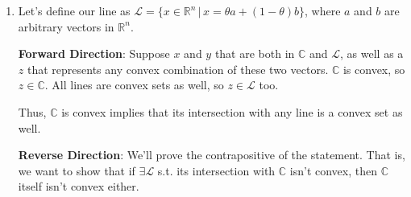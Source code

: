 \documentclass[12pt]{article}
\begin{document}
\begin{enumerate}
      \item Let's define our line as $\mathcal{L} = \{x \in \mathbb{R}^n\,|\, x=\theta a + (1-\theta) b\}$,
            where $a$ and $b$ are arbitrary vectors in $\mathbb{R}^n$.

            \textbf{Forward Direction}:
            Suppose $x$ and $y$ that are both in $\mathbb{C}$ and $\mathcal{L}$,
            as well as a $z$ that represents any convex combination of these two vectors.
            $\mathbb{C}$ is convex, so $z \in \mathbb{C}$.
            All lines are convex sets as well, so $z \in \mathcal{L}$ too.

            Thus, $\mathbb{C}$ is convex implies that its intersection
            with any line is a convex set as well.

            \textbf{Reverse Direction}:
            We'll prove the contrapositive of the statement.
            That is, we want to show that if $\exists \mathcal{L}$
            s.t. its intersection with $\mathbb{C}$ isn't convex,
            then $\mathbb{C}$ itself isn't convex either.


\end{enumerate}
\end{document}
